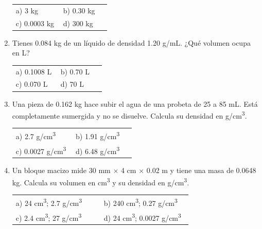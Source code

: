\documentclass[11pt,a4paper]{article}
\begin{document}
\begin{enumerate}[label=\textbf{\arabic*.},leftmargin=*,itemsep=16pt,topsep=0pt]
\begin{minipage}[t]{\linewidth}
\vspace{7pt}
\begin{tabular}{@{}p{0.48\linewidth}p{0.48\linewidth}@{}}
a) 3 kg & b) 0.30 kg \\[5pt]
c) 0.0003 kg & d) 300 kg \\
\end{tabular}
\end{minipage}

\item \begin{minipage}[t]{\linewidth}
Tienes 0.084 kg de un líquido de densidad 1.20 g/mL. ¿Qué volumen ocupa en L?

\vspace{7pt}
\begin{tabular}{@{}p{0.48\linewidth}p{0.48\linewidth}@{}}
a) 0.1008 L & b) 0.70 L \\[5pt]
c) 0.070 L & d) 70 L \\
\end{tabular}
\end{minipage}

\item \begin{minipage}[t]{\linewidth}
Una pieza de 0.162 kg hace subir el agua de una probeta de 25 a 85 mL. Está completamente sumergida y no se disuelve. Calcula su densidad en g/cm\textsuperscript{3}.

\vspace{7pt}
\begin{tabular}{@{}p{0.48\linewidth}p{0.48\linewidth}@{}}
a) 2.7 g/cm\textsuperscript{3} & b) 1.91 g/cm\textsuperscript{3} \\[5pt]
c) 0.0027 g/cm\textsuperscript{3} & d) 6.48 g/cm\textsuperscript{3} \\
\end{tabular}
\end{minipage}


\newpage
\item \begin{minipage}[t]{\linewidth}
Un bloque macizo mide 30 mm \(\times\) 4 cm \(\times\) 0.02 m y tiene una masa de 0.0648 kg. Calcula su volumen en cm\textsuperscript{3} y su densidad en g/cm\textsuperscript{3}.

\vspace{7pt}
\begin{tabular}{@{}p{0.48\linewidth}p{0.48\linewidth}@{}}
a) 24 cm\textsuperscript{3}; 2.7 g/cm\textsuperscript{3} & b) 240 cm\textsuperscript{3}; 0.27 g/cm\textsuperscript{3} \\[5pt]
c) 2.4 cm\textsuperscript{3}; 27 g/cm\textsuperscript{3} & d) 24 cm\textsuperscript{3}; 0.0027 g/cm\textsuperscript{3} \\
\end{tabular}
\end{minipage}


\end{enumerate}
\end{document}
